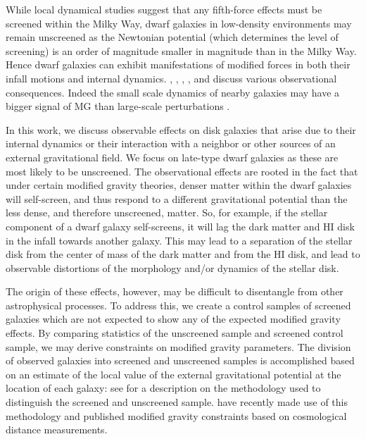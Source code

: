 \documentclass[useAMS,usenatbib,twocolumn]{mn2e}
\begin{document}
While local dynamical studies suggest that any fifth-force effects must be
screened within the Milky Way, 
dwarf galaxies in low-density environments may remain unscreened as the 
Newtonian potential (which determines the level of screening) is an order of
magnitude smaller in magnitude than in the Milky Way. Hence dwarf galaxies can
exhibit manifestations of modified forces in both their infall motions and
internal dynamics. \citet{hui09}, \citet{hui10}, \citet{bhuvjake2011},
\citet{changhui}, and \cite{jainvinu2012}
discuss various observational consequences. Indeed the small scale dynamics of 
nearby galaxies may have a bigger signal of MG than large-scale perturbations 
\citep[see][for a discussion of observational approaches]{jain11}.
 
In this work, we discuss observable effects on disk galaxies that  arise due to 
their internal dynamics or their interaction with a neighbor or other sources of
an external gravitational field. We focus on late-type dwarf galaxies as these
are most likely to be unscreened. The observational effects are rooted in the
fact that under certain modified gravity theories, denser matter within
the dwarf galaxies will self-screen, and thus respond to a different
gravitational potential than the less dense, and therefore unscreened, matter.
So, for example, if the stellar component of a dwarf galaxy self-screens,
it will lag the dark matter and HI disk in the infall towards
another galaxy. This may lead to a separation of the stellar disk from the
center of mass of the dark matter and from the HI disk, and lead to
observable distortions of the morphology and/or dynamics of the stellar disk.

The origin of these effects, however, 
may be difficult to disentangle from other astrophysical
processes. To address this, we create a control samples of screened galaxies
which are not expected to show any of the expected modified gravity effects.
By comparing statistics of the unscreened sample and screened control
sample, we may derive constraints on modified gravity parameters.
The division of observed galaxies into screened and unscreened samples
is accomplished based on an estimate of
the local value of the external gravitational potential at the location
of each galaxy: see \cite{cabre2012} for a description on the methodology
used to distinguish the screened and unscreened sample.
\cite{jainvinu2012} have recently made use of this methodology and
published modified gravity constraints
based on cosmological distance measurements.
\end{document}
